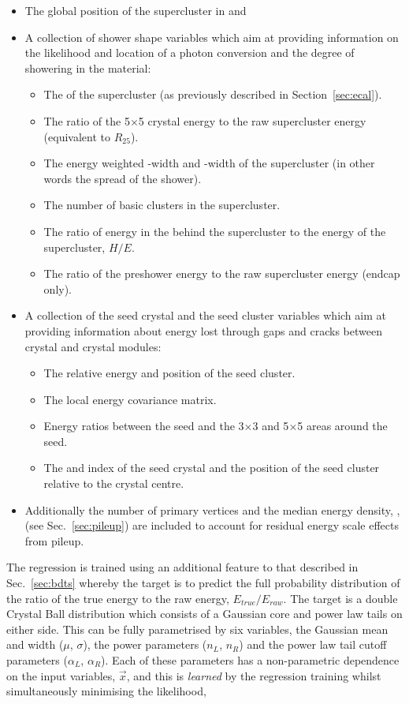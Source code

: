\begin{itemize}
  \item The global position of the supercluster in \eta and \phi
  \item A collection of shower shape variables which aim at providing information on the likelihood and location of a photon conversion and the degree of showering in the material:
  \begin{itemize}
    \item The \rnine of the supercluster (as previously described in Section~\ref{sec:ecal}).
    \item The ratio of the 5$\times$5 crystal energy to the raw supercluster energy (equivalent to $R_{25}$).
    \item The energy weighted \eta-width and \phi-width of the supercluster (in other words the spread of the shower).
    \item The number of basic clusters in the supercluster.
    \item The ratio of energy in the \HCAL behind the supercluster to the \ECAL energy of the supercluster, $H/E$.
    \item The ratio of the preshower energy to the raw supercluster energy (endcap only).
  \end{itemize}
  \item A collection of the seed crystal and the seed cluster variables which aim at providing information about energy lost through gaps and cracks between crystal and crystal modules:
  \begin{itemize}
    \item The relative energy and position of the seed cluster.
    \item The local energy covariance matrix.
    \item Energy ratios between the seed and the 3$\times$3 and 5$\times$5 areas around the seed.
    \item The \eta and \phi index of the seed crystal and the position of the seed cluster relative to the crystal centre. 
  \end{itemize}
  \item Additionally the number of primary vertices and the median energy density, \rho, (see Sec.~\ref{sec:pileup}) are included to account for residual energy scale effects from pileup.
\end{itemize}
The regression is trained using an additional feature to that described in Sec.~\ref{sec:bdts} whereby the target is to predict the full probability distribution of the ratio of the true energy to the raw energy, $E_{true}/E_{raw}$. The target is a double Crystal Ball distribution which consists of a Gaussian core and power law tails on either side. This can be fully parametrised by six variables, the Gaussian mean and width ($\mu$, $\sigma$), the power parameters ($n_{L}$, $n_{R}$) and the power law tail cutoff parameters ($\alpha_{L}$, $\alpha_{R}$). Each of these parameters has a non-parametric dependence on the input variables, $\vec{x}$, and this is \emph{learned} by the regression training whilst simultaneously minimising the likelihood,

